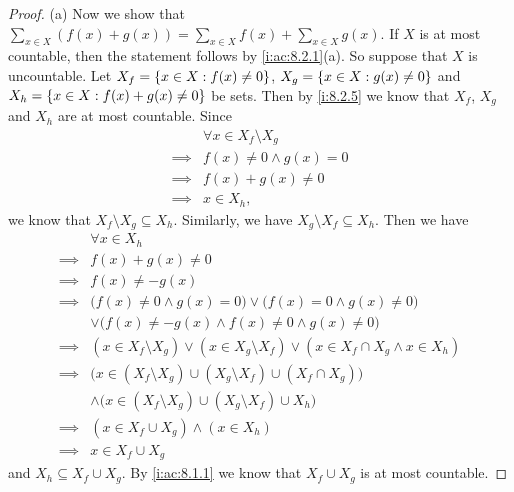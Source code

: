 \begin{proof}{(a)}
  Now we show that \(\sum_{x \in X} (f(x) + g(x)) = \sum_{x \in X} f(x) + \sum_{x \in X} g(x)\).
  If \(X\) is at most countable, then the statement follows by \cref{i:ac:8.2.1}(a).
  So suppose that \(X\) is uncountable.
  Let \(X_f = \left\lbrace x \in X : f(x) \neq 0\right\rbrace\), \(X_g = \left\lbrace x \in X : g(x) \neq 0\right\rbrace\) and \(X_h = \left\lbrace x \in X : f(x) + g(x) \neq 0\right\rbrace\) be sets.
  Then by \cref{i:8.2.5} we know that \(X_f\), \(X_g\) and \(X_h\) are at most countable.
  Since
  \begin{align*}
             & \forall x \in X_f \setminus X_g \\
    \implies & f(x) \neq 0 \land g(x) = 0      \\
    \implies & f(x) + g(x) \neq 0              \\
    \implies & x \in X_h,
  \end{align*}
  we know that \(X_f \setminus X_g \subseteq X_h\).
  Similarly, we have \(X_g \setminus X_f \subseteq X_h\).
  Then we have
  \begin{align*}
             & \forall x \in X_h                                                                                  \\
    \implies & f(x) + g(x) \neq 0                                                                                 \\
    \implies & f(x) \neq -g(x)                                                                                    \\
    \implies & \big(f(x) \neq 0 \land g(x) = 0\big) \lor \big(f(x) = 0 \land g(x) \neq 0\big)                     \\
             & \lor \big(f(x) \neq -g(x) \land f(x) \neq 0 \land g(x) \neq 0\big)                                 \\
    \implies & (x \in X_f \setminus X_g) \lor (x \in X_g \setminus X_f) \lor (x \in X_f \cap X_g \land x \in X_h) \\
    \implies & \big(x \in (X_f \setminus X_g) \cup (X_g \setminus X_f) \cup (X_f \cap X_g)\big)                   \\
             & \land \big(x \in (X_f \setminus X_g) \cup (X_g \setminus X_f) \cup X_h\big)                        \\
    \implies & (x \in X_f \cup X_g) \land (x \in X_h)                                                             \\
    \implies & x \in X_f \cup X_g
  \end{align*}
  and \(X_h \subseteq X_f \cup X_g\).
  By \cref{i:ac:8.1.1} we know that \(X_f \cup X_g\) is at most countable.

\end{proof}
